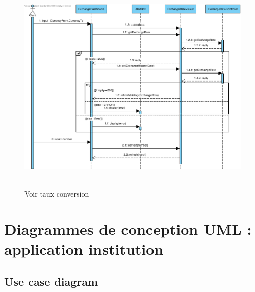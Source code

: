 \documentclass[]{report}
\begin{document}
\begin{figure}[h!]
	\hbox{
		\centering\includegraphics[width=\linewidth]{img/Sequence 3 - Extension 2.pdf}
	}
	\caption{Voir taux conversion}
\end{figure}

\newpage



\section{Diagrammes de conception UML : application institution}



\subsection{Use case diagram}
\end{document}
